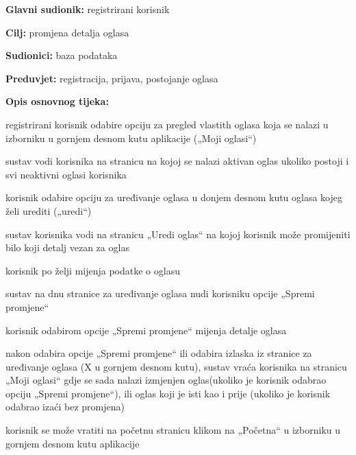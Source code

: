 \noindent {}
\begin{packed_item}
	
	\item \textbf{Glavni sudionik: } registrirani korisnik
	\item  \textbf{Cilj:} promjena detalja oglasa
	\item  \textbf{Sudionici:} baza podataka
	\item  \textbf{Preduvjet:} registracija, prijava, postojanje oglasa
	\item  \textbf{Opis osnovnog tijeka:}
	
	\item[] \begin{packed_enum}
		
		\item registrirani korisnik odabire opciju za pregled vlastith oglasa koja se nalazi u izborniku u gornjem desnom kutu aplikacije („Moji oglasi“)
		\item sustav vodi korisnika na stranicu na kojoj se nalazi aktivan oglas ukoliko postoji i svi neaktivni oglasi korisnika
		\item korisnik odabire opciju za uređivanje oglasa u donjem desnom kutu oglasa kojeg želi urediti („uredi“)
		\item sustav korisnika vodi na stranicu „Uredi oglas“ na kojoj korisnik može promijeniti bilo koji detalj vezan za oglas
		\item korisnik po želji mijenja podatke o oglasu
		\item sustav na dnu stranice za uređivanje oglasa nudi korisniku opcije „Spremi promjene“
		\item korisnik odabirom opcije „Spremi promjene“ mijenja detalje oglasa
		\item nakon odabira opcije „Spremi promjene“ ili odabira izlaska iz stranice za uređivanje oglasa (X u gornjem desnom kutu), sustav vraća korisnika na stranicu „Moji oglasi“ gdje se sada nalazi izmjenjen oglas(ukoliko je korisnik odabrao opciju „Spremi promjene“), ili oglas koji je isti kao i prije (ukoliko je korisnik odabrao izaći bez promjena)
		\item korisnik se može vratiti na početnu stranicu klikom na „Početna“ u izborniku u gornjem desnom kutu aplikacije
		
	\end{packed_enum}
	
\end{packed_item}


